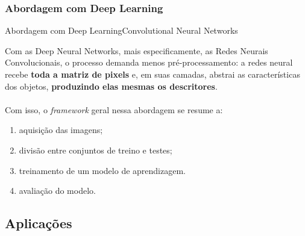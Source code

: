 \documentclass{beamer}
\begin{document}
    \subsubsection{Abordagem com Deep Learning}
    \begin{frame}{Abordagem com Deep Learning}{Convolutional Neural Networks}
        
        Com as Deep Neural Networks, mais especificamente,
        as Redes Neurais Convolucionais, o processo demanda menos
        pré-processamento: a redes neural
        recebe \textbf{toda a matriz de pixels}
        e, em suas camadas, abstrai as características
        dos objetos, \textbf{produzindo elas mesmas os descritores}.
        \\~\\
        Com isso, o \emph{framework} geral nessa abordagem 
        se resume a:
        \begin{enumerate}
            \item aquisição das imagens;
            \item divisão entre conjuntos de treino e testes;
            \item treinamento de um modelo de aprendizagem.
            \item avaliação do modelo.
        \end{enumerate}
   
    \end{frame}

    \subsection{Aplicações}
    
\end{document}
